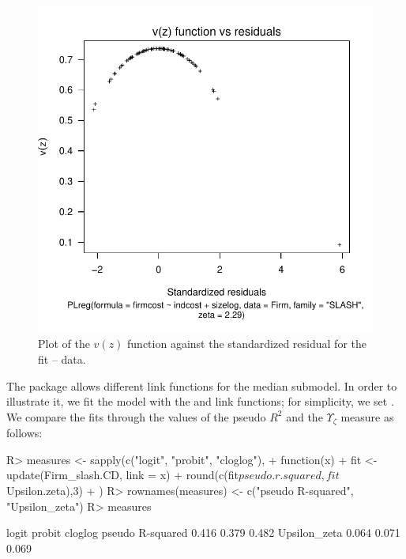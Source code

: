 \begin{figure}[t]
\centering
\includegraphics[scale=0.65]{figures/Fig6.pdf}
\caption{\label{fig:Fig6} Plot of the $v(z)$ function against the standardized residual for the  fit --  data.}
\end{figure}

The  package allows different link functions for the median submodel. In order to illustrate it, we fit the model with the  and  link functions; for simplicity, we set . We compare the fits through the values of the pseudo $R^2$ and the $\Upsilon_\zeta$ measure as follows:
%
\begin{Schunk}
\begin{Sinput}
R> measures <- sapply(c("logit", "probit", "cloglog"),
+                     function(x){
+                       fit <- update(Firm_slash.CD, link = x)
+                       round(c(fit$pseudo.r.squared, fit$Upsilon.zeta),3)
+                     })
R> rownames(measures) <- c("pseudo R-squared", "Upsilon_zeta")
R> measures
\end{Sinput}
\begin{Soutput}
                 logit probit cloglog
pseudo R-squared 0.416  0.379   0.482
Upsilon_zeta     0.064  0.071   0.069
\end{Soutput}
\end{Schunk}

